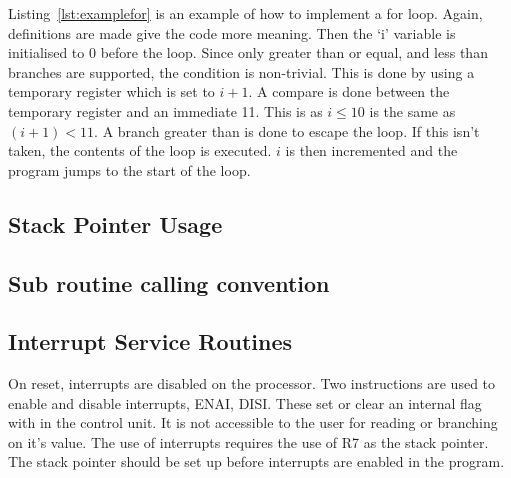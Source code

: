 

Listing~\ref{lst:examplefor} is an example of how to implement a for loop. 
Again, definitions are made give the code more meaning. 
Then the `i' variable is initialised to 0 before the loop. 
Since only greater than or equal, and less than branches are supported, the condition is non-trivial.
This is done by using a temporary register which is set to $i + 1$. 
A compare is done between the temporary register and an immediate 11.
This is as $i \leq 10$ is the same as $(i+1) < 11$. 
A branch greater than is done to escape the loop. 
If this isn't taken, the contents of the loop is executed.
$i$ is then incremented and the program jumps to the start of the loop. 







\subsection{Stack Pointer Usage}


\subsection{Sub routine calling convention}


\subsection{Interrupt Service Routines}

On reset, interrupts are disabled on the \samurai{} processor.
Two instructions are used to enable and disable interrupts, ENAI, DISI.
These set or clear an internal flag with in the control unit. 
It is not accessible to the user for reading or branching on it's value.
The use of interrupts requires the use of R7 as the stack pointer. 
The stack pointer should be set up before interrupts are enabled in the program.


